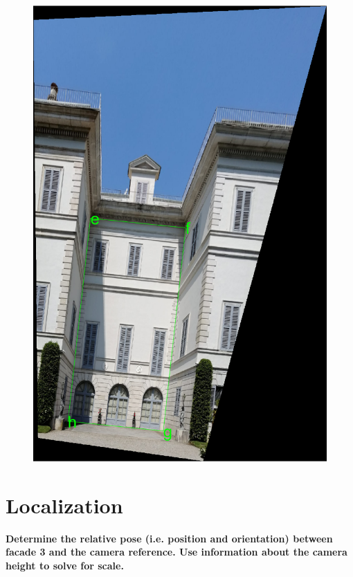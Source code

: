 \documentclass[11pt, oneside]{article}
\begin{document}
\begin{figure}[!h]
	\quad
	\begin{minipage}{.5\textwidth}
		\centering
		\includegraphics[scale = 0.4]{image_rectification_vertical_facade.png}
		\label{image_rectification_vertical_facade}
	\end{minipage}
\end{figure}
\pagebreak

\section{Localization}
\textbf{Determine the relative pose (i.e. position and orientation) between facade 3 and the camera reference. Use information about the camera height to solve for scale.} \hfill \break
\end{document}
